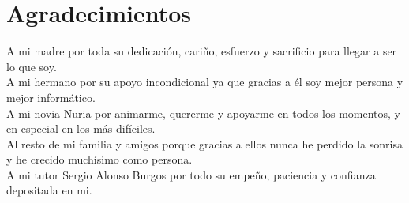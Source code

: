 \chapter*{Agradecimientos}
\thispagestyle{empty}

       \vspace{1cm}

A mi madre por toda su dedicación, cariño, esfuerzo y sacrificio para llegar a ser lo que soy.\\

A mi hermano por su apoyo incondicional ya que gracias a él soy mejor persona y mejor informático.\\

A mi novia Nuria por animarme, quererme y apoyarme en todos los momentos, y en especial en los más difíciles.\\

Al resto de mi familia y amigos porque gracias a ellos nunca he perdido la sonrisa y he crecido muchísimo como persona.\\

A mi tutor Sergio Alonso Burgos por todo su empeño, paciencia y confianza depositada en mi.

